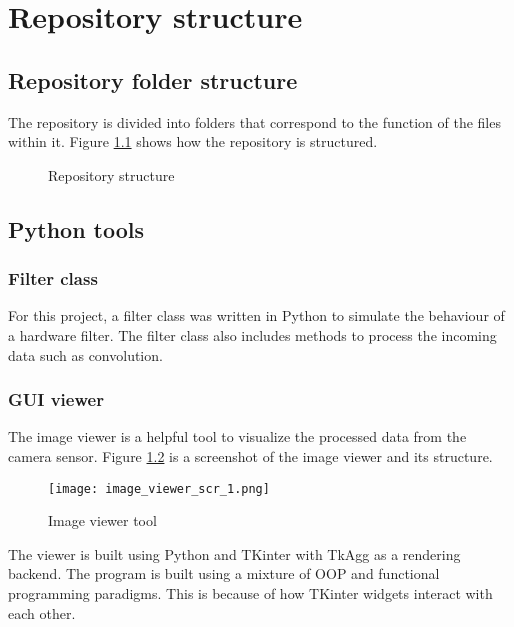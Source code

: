 \chapter{Repository structure}
\section{Repository folder structure}

The repository is divided into folders that correspond to the function of the files within it. Figure \ref{fig:repo_folder_diagram} shows how the repository is structured.


\begin{figure}[h]
    \centering
    
    \caption{Repository structure}
    \label{fig:repo_folder_diagram}
\end{figure}




\section{Python tools}

\subsection{Filter class}

For this project, a filter class was written in Python to simulate the behaviour of a hardware filter. The filter class also includes methods to process the incoming data such as convolution.




\subsection{GUI viewer}

The image viewer is a helpful tool to visualize the processed data from the camera sensor. Figure \ref{fig:image_viewer_scr_1} is a screenshot of the image viewer and its structure.


\begin{figure}[h]
    \centering
    \texttt{[image: image\_viewer\_scr\_1.png]}
    \caption{Image viewer tool}
    \label{fig:image_viewer_scr_1}
\end{figure}

The viewer is built using Python and TKinter with TkAgg as a rendering backend. The program is built using a mixture of OOP and functional programming paradigms. This is because of how TKinter widgets interact with each other.

